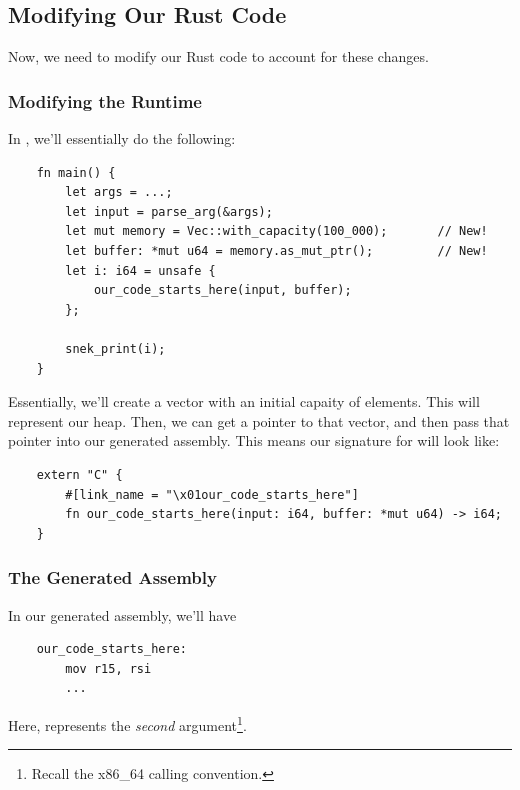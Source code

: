 \documentclass[letterpaper]{article}
\begin{document}
\subsection{Modifying Our Rust Code}
Now, we need to modify our Rust code to account for these changes. 

\subsubsection{Modifying the Runtime}
In , we'll essentially do the following:
\begin{verbatim}
    fn main() {
        let args = ...;
        let input = parse_arg(&args);
        let mut memory = Vec::with_capacity(100_000);       // New!
        let buffer: *mut u64 = memory.as_mut_ptr();         // New! 
        let i: i64 = unsafe {
            our_code_starts_here(input, buffer); 
        };

        snek_print(i);
    }\end{verbatim}
Essentially, we'll create a vector with an initial capaity of  elements. This will represent our heap. Then, we can get a pointer to that vector, and then pass that pointer into our generated assembly. This means our signature for  will look like:
\begin{verbatim}
    extern "C" {
        #[link_name = "\x01our_code_starts_here"]
        fn our_code_starts_here(input: i64, buffer: *mut u64) -> i64;
    }\end{verbatim}

\subsubsection{The Generated Assembly}
In our generated assembly, we'll have 
\begin{verbatim}
    our_code_starts_here:
        mov r15, rsi
        ...\end{verbatim}
Here,  represents the \emph{second} argument\footnote{Recall the x86\_64 calling convention.}. 
\end{document}
